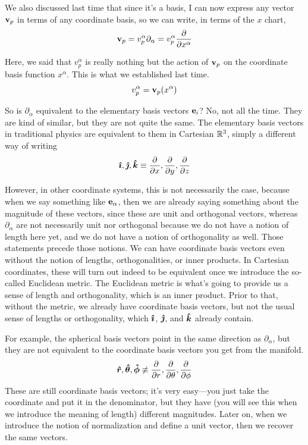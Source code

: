 		We also discussed last time that since it's a basis, I can now express any vector $\vb{v}_p$ in terms
		of any coordinate basis, so we can write, in terms of the $x$ chart,
		\[
			\vb{v}_p = 
			v_p^\alpha \partial_\alpha = 
			v_p^\alpha \pdv{}{x^\alpha}  
		\]

		Here, we said that $v_p^\alpha$ is really nothing but the action of $\vb{v}_p$ on the
		coordinate basis function $x^\alpha$. This is what we established last time.
		\[
			v_p^\alpha = \vb{v}_p(x^\alpha)  
		\]

		\begin{question}{So is $\partial_\alpha$ equivalent to the elementary basis vectors $\vb{e}_i$?}
			No, not all the time. They are kind of similar, but they are not quite the same. The elementary basis vectors
			in traditional physics are equivalent to them in Cartesian $\mathbb{R}^3$, simply
			a different way of writing
			\[
				\vu*{\imath}, \vu*{\jmath}, \vu*{k} \equiv \pdv{}{x},\pdv{}{y},\pdv{}{z} 
			\]

			However, in other coordinate systems, this is not necessarily the case, because when we say
			something like $\vb{e}_\alpha$, then we are already saying something about the magnitude
			of these vectors, since these are unit and orthogonal vectors, whereas $\partial_\alpha$
			are not necessarily unit nor orthogonal because we do not have a notion of length here yet,
			and we do not have a notion of orthogonality as well. Those statements precede those notions.
			We can have coordinate basis vectors even without the notion of lengths, orthogonalities, or
			inner products. In Cartesian coordinates, these will turn out indeed to be equivalent once we introduce
			the so-called Euclidean metric. The Euclidean metric is what's going to provide us a sense of
			length and orthogonality, which is an inner product. Prior to that, without the metric, we already
			have coordinate basis vectors, but not the usual sense of lengths or orthogonality, which $\vu*{\imath}$, $\vu*{\jmath}$, and $\vu*{k}$
			already contain.

			\hspace{1em}For example, the spherical basis vectors point in the same direction as $\partial_\alpha$, but they
			are not equivalent to the coordinate basis vectors you get from the manifold.
			\[
				\vu*{r}, \vu*{\theta}, \vu*{\phi}\not\equiv \pdv{}{r},\pdv{}{\theta},\pdv{}{\phi}  
			\]
			These are still coordinate basis vectors; it's very easy—you just take the coordinate and put it in the denominator,
			but they have (you will see this when we introduce the meaning of length) different
			magnitudes. Later on, when we introduce the notion of normalization and define a unit vector, then we recover the same vectors.
		\end{question}

